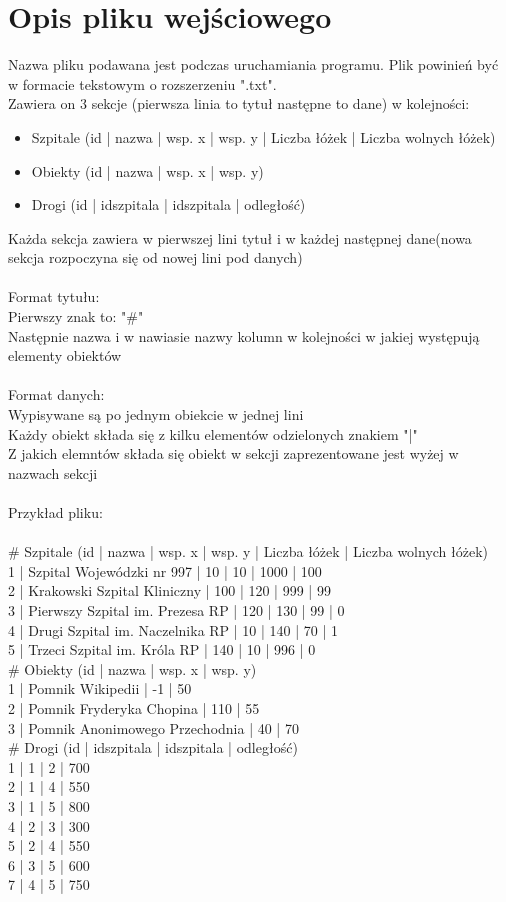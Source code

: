 \documentclass[]{article}
\begin{document}
\section{Opis pliku wejściowego}
Nazwa pliku podawana jest podczas uruchamiania programu.
Plik powinień być w formacie tekstowym o rozszerzeniu ".txt". \\
Zawiera on 3 sekcje (pierwsza linia to tytuł następne to dane) w kolejności:
\begin{itemize}
\item Szpitale (id | nazwa | wsp. x | wsp. y | Liczba łóżek | Liczba wolnych łóżek)
\item Obiekty (id | nazwa | wsp. x | wsp. y)
\item Drogi (id | idszpitala | idszpitala | odległość)
\end{itemize}
Każda sekcja zawiera w pierwszej lini tytuł i w każdej następnej dane(nowa sekcja rozpoczyna się od nowej lini pod danych)\\
\\
Format tytułu:\\
Pierwszy znak to: "\#"\\
Następnie nazwa i w nawiasie nazwy kolumn w kolejności w jakiej występują elementy obiektów\\
\\
Format danych:\\
Wypisywane są po jednym obiekcie w jednej lini\\
Każdy obiekt składa się z kilku elementów odzielonych znakiem "|"\\
Z jakich elemntów składa się obiekt w sekcji zaprezentowane jest wyżej w nazwach sekcji\\
\\
Przykład pliku:\\
\\
\# Szpitale (id | nazwa | wsp. x | wsp. y | Liczba łóżek | Liczba wolnych łóżek)\\
1 | Szpital Wojewódzki nr 997 | 10 | 10 | 1000 | 100\\
2 | Krakowski Szpital Kliniczny | 100 | 120 | 999 | 99\\
3 | Pierwszy Szpital im. Prezesa RP | 120 | 130 | 99 | 0\\
4 | Drugi Szpital im. Naczelnika RP | 10 | 140 | 70 | 1\\
5 | Trzeci Szpital im. Króla RP | 140 | 10 | 996 | 0\\
\# Obiekty (id | nazwa | wsp. x | wsp. y)\\
1 | Pomnik Wikipedii | -1 | 50\\
2 | Pomnik Fryderyka Chopina | 110 | 55\\
3 | Pomnik Anonimowego Przechodnia | 40 | 70\\
\# Drogi (id | idszpitala | idszpitala | odległość)\\
1 | 1 | 2 | 700\\
2 | 1 | 4 | 550\\
3 | 1 | 5 | 800\\
4 | 2 | 3 | 300\\
5 | 2 | 4 | 550\\
6 | 3 | 5 | 600\\
7 | 4 | 5 | 750\\
\end{document}
